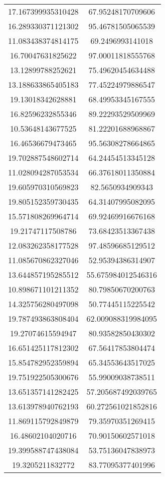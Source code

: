 \begin{table}
\begin{tabular}{cc}
17.167399935310428 & 67.95248170709606 \\
16.289330371121302 & 95.46781505065539 \\
11.083438374814175 & 69.2496993141018 \\
16.70047631825622 & 97.00011818555768 \\
13.12899788252621 & 75.49620454634488 \\
13.188633865405183 & 77.45224979886547 \\
19.13018342628881 & 68.49953345167555 \\
16.82596232855346 & 89.22293529509969 \\
10.53648143677525 & 81.22201688968867 \\
16.46536679473465 & 95.56308278664865 \\
19.702887548602714 & 64.24454513345128 \\
11.028094287053534 & 66.37618011350884 \\
19.605970310569823 & 82.5650934909343 \\
19.805152359730435 & 64.31407995082095 \\
15.571808269964714 & 69.92469916676168 \\
19.21747117508786 & 73.68423513367438 \\
12.083262358177528 & 97.48596685129512 \\
11.085670862327046 & 52.95394386314907 \\
13.644857195285512 & 55.675984012546316 \\
10.898671101211352 & 80.79850670200763 \\
14.325756280497098 & 50.77445115225542 \\
19.787493863808404 & 62.009088319984095 \\
19.27074615594947 & 80.93582850430302 \\
16.651425117812302 & 67.56417853804474 \\
15.854782952359894 & 65.34553643517025 \\
19.751922505300676 & 55.99009038738511 \\
13.651357141282425 & 57.205687492039765 \\
13.613978940762193 & 60.272561021852816 \\
11.869115792849879 & 79.35970351269415 \\
16.48602104020716 & 70.90150602571018 \\
19.399588747438084 & 53.75136047838973 \\
19.3205211832772 & 83.77095377401996 \\

\end{tabular}
\end{table}
